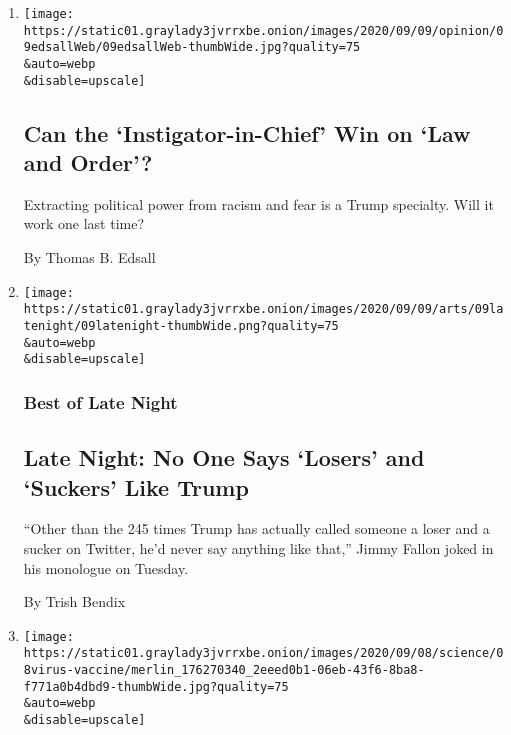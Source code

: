 \begin{enumerate}
\def\labelenumi{\arabic{enumi}.}
\item
  \href{/2020/09/09/opinion/trump-portland-kenosha.html}{}

  \texttt{[image: https://static01.graylady3jvrrxbe.onion/images/2020/09/09/opinion/09edsallWeb/09edsallWeb-thumbWide.jpg?quality=75\\\&auto=webp\\\&disable=upscale]}

  \hypertarget{can-the-instigator-in-chief-win-on-law-and-order}{%
  \subsection{Can the `Instigator-in-Chief' Win on `Law and
  Order'?}\label{can-the-instigator-in-chief-win-on-law-and-order}}

  Extracting political power from racism and fear is a Trump specialty.
  Will it work one last time?

  By Thomas B. Edsall
\item
  \href{/2020/09/09/arts/television/late-night-trump-losers-suckers.html}{}

  \texttt{[image: https://static01.graylady3jvrrxbe.onion/images/2020/09/09/arts/09latenight/09latenight-thumbWide.png?quality=75\\\&auto=webp\\\&disable=upscale]}

  \hypertarget{best-of-late-night}{%
  \subsubsection{Best of Late Night}\label{best-of-late-night}}

  \hypertarget{late-night-no-one-says-losers-and-suckers-like-trump}{%
  \subsection{Late Night: No One Says `Losers' and `Suckers' Like
  Trump}\label{late-night-no-one-says-losers-and-suckers-like-trump}}

  ``Other than the 245 times Trump has actually called someone a loser
  and a sucker on Twitter, he'd never say anything like that,'' Jimmy
  Fallon joked in his monologue on Tuesday.

  By Trish Bendix
\item
  \href{/2020/09/08/health/coronavirus-astrazeneca-vaccine-safety.html}{}

  \texttt{[image: https://static01.graylady3jvrrxbe.onion/images/2020/09/08/science/08virus-vaccine/merlin\_176270340\_2eeed0b1-06eb-43f6-8ba8-f771a0b4dbd9-thumbWide.jpg?quality=75\\\&auto=webp\\\&disable=upscale]}


\end{enumerate}
